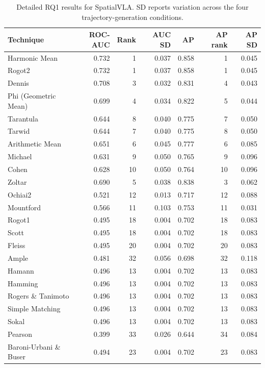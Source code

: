 \begin{table}[t]
\centering
\caption{Detailed RQ1 results for SpatialVLA. SD reports variation across the four trajectory-generation conditions.}
\label{tab:rq1-supplementary-spatialvla}
{\scriptsize
\setlength{\tabcolsep}{4pt}
\renewcommand{\arraystretch}{0.96}
\begin{tabular}{lrrrrrr}
\toprule
Technique & ROC-AUC & Rank & AUC SD & AP & AP rank & AP SD \\
\midrule
Harmonic Mean & 0.732 & 1 & 0.037 & 0.858 & 1 & 0.045 \\
Rogot2 & 0.732 & 1 & 0.037 & 0.858 & 1 & 0.045 \\
Dennis & 0.708 & 3 & 0.032 & 0.831 & 4 & 0.043 \\
Phi (Geometric Mean) & 0.699 & 4 & 0.034 & 0.822 & 5 & 0.044 \\
Tarantula & 0.644 & 8 & 0.040 & 0.775 & 7 & 0.050 \\
Tarwid & 0.644 & 7 & 0.040 & 0.775 & 8 & 0.050 \\
Arithmetic Mean & 0.651 & 6 & 0.045 & 0.777 & 6 & 0.085 \\
Michael & 0.631 & 9 & 0.050 & 0.765 & 9 & 0.096 \\
Cohen & 0.628 & 10 & 0.050 & 0.764 & 10 & 0.096 \\
Zoltar & 0.690 & 5 & 0.038 & 0.838 & 3 & 0.062 \\
Ochiai2 & 0.521 & 12 & 0.013 & 0.717 & 12 & 0.088 \\
Mountford & 0.566 & 11 & 0.103 & 0.753 & 11 & 0.031 \\
Rogot1 & 0.495 & 18 & 0.004 & 0.702 & 18 & 0.083 \\
Scott & 0.495 & 18 & 0.004 & 0.702 & 18 & 0.083 \\
Fleiss & 0.495 & 20 & 0.004 & 0.702 & 20 & 0.083 \\
Ample & 0.481 & 32 & 0.056 & 0.698 & 32 & 0.118 \\
Hamann & 0.496 & 13 & 0.004 & 0.702 & 13 & 0.083 \\
Hamming & 0.496 & 13 & 0.004 & 0.702 & 13 & 0.083 \\
Rogers \& Tanimoto & 0.496 & 13 & 0.004 & 0.702 & 13 & 0.083 \\
Simple Matching & 0.496 & 13 & 0.004 & 0.702 & 13 & 0.083 \\
Sokal & 0.496 & 13 & 0.004 & 0.702 & 13 & 0.083 \\
Pearson & 0.399 & 33 & 0.026 & 0.644 & 34 & 0.084 \\
Baroni-Urbani \& Buser & 0.494 & 23 & 0.004 & 0.702 & 23 & 0.083 \\

\end{tabular}}
\end{table}
